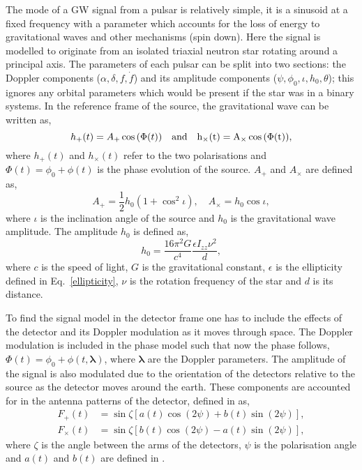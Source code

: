 The mode of a \ac{GW} signal from a pulsar is relatively simple, it is a sinusoid at a fixed frequency with a parameter which accounts for the loss of energy to gravitational waves and other mechanisms (spin down). 
Here the signal is modelled to originate from an isolated triaxial neutron star rotating around a principal axis. 
The parameters of each pulsar can be split into two sections: the Doppler components ($\alpha,\delta,f,\dot{f}$) and its amplitude components ($\psi,\phi_0, \iota, h_0, \theta$); this ignores any orbital parameters which would be present if the star was in a binary systems.
In the reference frame of the source, the gravitational wave can be written as,
\begin{equation}
h_{+}(t) = A_{+}\cos{(\Phi(t))} \quad \rm{and} \quad h_{\times}(t) = A_{\times}\cos{(\Phi(t))},
\end{equation}
where $h_{+}(t)$ and $h_{\times}(t)$ refer to the two polarisations and $\Phi(t) = \phi_0 + \phi(t)$ is the phase evolution of the source. $A_+$ and $A_{\times}$ are defined as,
\begin{equation}
A_+ = \frac{1}{2}h_0(1+\cos^2{\iota}), \quad A_{\times} = h_0 \cos{\iota},
\end{equation}
where $\iota$ is the inclination angle of the source and $h_0$ is the gravitational wave amplitude. The amplitude $h_0$ is defined as,
\begin{equation}
h_0 = \frac{16\pi^2 G}{c^4} \frac{\epsilon I_{zz} \nu^2}{d},
\end{equation}
where $c$ is the speed of light, $G$ is the gravitational constant, $\epsilon $ is the ellipticity defined in Eq.~\ref{ellipticity}, $\nu$ is the rotation frequency of the star and $d$ is its distance. 

To find the signal model in the detector frame one has to include the effects of the detector and its Doppler modulation as it moves through space. 
The Doppler modulation is included in the phase model such that now the phase follows, $\Phi(t) = \phi_0 + \phi(t, {\boldsymbol \lambda})$, where ${\boldsymbol \lambda}$ are the Doppler parameters. 
The amplitude of the signal is also modulated due to the orientation of the detectors relative to the source as the detector moves around the earth. These components are accounted for in the antenna patterns of the detector, defined in \citep{JKS1998} as,
\begin{equation}
\begin{split}
F_{+}(t) &= \sin{\zeta}[a(t)\cos{(2\psi)} + b(t)\sin{(2\psi)}], \\
F_{\times}(t) &= \sin{\zeta}[b(t) \cos{(2\psi)} - a(t)\sin{(2\psi)}],
\end{split}
\end{equation}
where $\zeta$ is the angle between the arms of the detectors, $\psi$ is the polarisation angle and $a(t)$ and $b(t)$ are defined in \citep{JKS1998}. 


